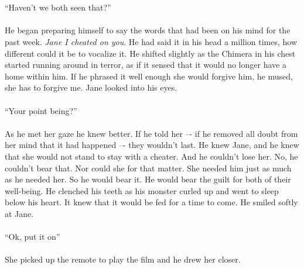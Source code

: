 \documentclass[12pt,oneside,openany]{memoir}
\begin{document}
\\\\
“Haven’t we both seen that?”
\\\\
He began preparing himself to say the words that had been on his mind for the past week. \textit{Jane I cheated on you}. He had said it in his head a million times, how different could it be to vocalize it. He shifted slightly as the Chimera in his chest started running around in terror, as if it sensed that it would no longer have a home within him. If he phrased it well enough she would forgive him, he mused, she has to forgive me. Jane looked into his eyes.
\\\\	
“Your point being?”
\\\\
As he met her gaze he knew better. If he told her –- if he removed all doubt from her mind that it had happened –- they wouldn’t last. He knew Jane, and he knew that she would not stand to stay with a cheater. And he couldn’t lose her. No, he couldn’t bear that. Nor could she for that matter. She needed him just as much as he needed her. So he would bear it. He would bear the guilt for both of their well-being. He clenched his teeth as his monster curled up and went to sleep below his heart. It knew that it would be fed for a time to come. He smiled softly at Jane.
\\\\
“Ok, put it on”
\\\\
She picked up the remote to play the film and he drew her closer.
\end{document}

